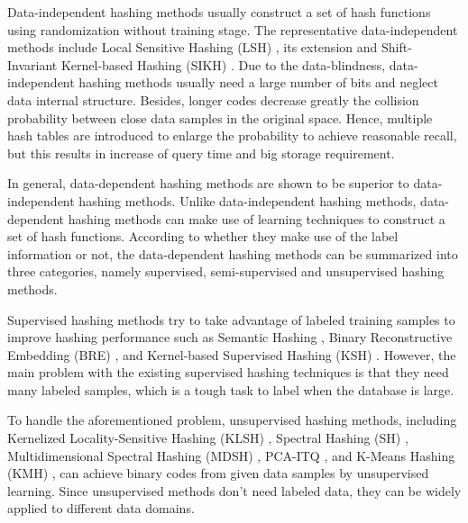 \documentclass{sig-alternate}
\begin{document}
Data-independent hashing methods usually construct a set of hash functions using randomization without training stage. The representative data-independent methods include Local Sensitive Hashing (LSH) \cite{DBLP:vldbGionisIM99-01}, its extension and Shift-Invariant Kernel-based Hashing (SIKH) \cite{DBLP:nipsRaginskyL09-02}. Due to the data-blindness, data-independent hashing methods usually need a large number of bits and neglect data internal structure. Besides, longer codes decrease greatly the collision probability between close data samples in the original space. Hence, multiple hash tables are introduced to enlarge the probability to achieve reasonable recall, but this results in increase of query time and big storage requirement.

In general, data-dependent hashing methods are shown to be superior to data-independent hashing methods. Unlike data-independent hashing methods, data-dependent hashing methods can make use of learning techniques to construct a set of hash functions. According to whether they make use of the label information or not, the data-dependent hashing methods can be summarized into three categories, namely supervised, semi-supervised \cite{DBLP:WangKC10-16} and unsupervised hashing methods.

Supervised hashing methods try to take advantage of labeled training samples to improve hashing performance such as Semantic Hashing \cite{DBLP:SalakhutdinovH09-05}, Binary Reconstructive Embedding (BRE) \cite{DBLP:nipsKulisD09-06}, and Kernel-based Supervised Hashing (KSH) \cite{DBLP:cvprLiuWJJC12-07}. However, the main problem with the existing supervised hashing techniques is that they need many labeled samples, which is a tough task to label when the database is large.

 To handle the aforementioned problem, unsupervised hashing methods, including Kernelized Locality-Sensitive Hashing (KLSH) \cite{DBLP:conf/iccvKulisG09-08}, Spectral Hashing (SH) \cite{DBLP:WeissTF08-09}, Multidimensional Spectral Hashing (MDSH) \cite{DBLP:eccvWeissFT12-10}, PCA-ITQ \cite{DBLP:cvprGongL11-11}, and K-Means Hashing (KMH) \cite{DBLP:HeWS13-03}, can achieve binary codes from given data samples by unsupervised learning. Since unsupervised methods don't need labeled data, they can be widely applied to different data domains.
\end{document}
